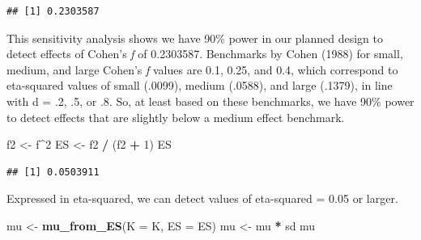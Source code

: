\documentclass[]{book}
\newenvironment{Shaded}{\begin{snugshade}}{\end{snugshade}}
\newcommand{\CommentTok}[1]{\textcolor[rgb]{0.56,0.35,0.01}{\textit{#1}}}
\newcommand{\DataTypeTok}[1]{\textcolor[rgb]{0.13,0.29,0.53}{#1}}
\newcommand{\DecValTok}[1]{\textcolor[rgb]{0.00,0.00,0.81}{#1}}
\newcommand{\FloatTok}[1]{\textcolor[rgb]{0.00,0.00,0.81}{#1}}
\newcommand{\KeywordTok}[1]{\textcolor[rgb]{0.13,0.29,0.53}{\textbf{#1}}}
\newcommand{\NormalTok}[1]{#1}
\newcommand{\OperatorTok}[1]{\textcolor[rgb]{0.81,0.36,0.00}{\textbf{#1}}}
\newcommand{\StringTok}[1]{\textcolor[rgb]{0.31,0.60,0.02}{#1}}
\begin{document}
\begin{Shaded}
\end{Shaded}

\begin{verbatim}
## [1] 0.2303587
\end{verbatim}

This sensitivity analysis shows we have 90\% power in our planned design to detect effects of Cohen's \emph{f} of 0.2303587. Benchmarks by Cohen (1988) for small, medium, and large Cohen's \emph{f} values are 0.1, 0.25, and 0.4, which correspond to eta-squared values of small (.0099), medium (.0588), and large (.1379), in line with d = .2, .5, or .8. So, at least based on these benchmarks, we have 90\% power to detect effects that are slightly below a medium effect benchmark.

\begin{Shaded}
\begin{Highlighting}[]
\NormalTok{f2 <-}\StringTok{ }\NormalTok{f}\OperatorTok{^}\DecValTok{2}
\NormalTok{ES <-}\StringTok{ }\NormalTok{f2 }\OperatorTok{/}\StringTok{ }\NormalTok{(f2 }\OperatorTok{+}\StringTok{ }\DecValTok{1}\NormalTok{)}
\NormalTok{ES}
\end{Highlighting}
\end{Shaded}

\begin{verbatim}
## [1] 0.0503911
\end{verbatim}

Expressed in eta-squared, we can detect values of eta-squared = 0.05 or larger.

\begin{Shaded}
\begin{Highlighting}[]
\NormalTok{mu <-}\StringTok{ }\KeywordTok{mu_from_ES}\NormalTok{(}\DataTypeTok{K =}\NormalTok{ K, }\DataTypeTok{ES =}\NormalTok{ ES)}
\NormalTok{mu <-}\StringTok{ }\NormalTok{mu }\OperatorTok{*}\StringTok{ }\NormalTok{sd}
\NormalTok{mu}
\end{Highlighting}
\end{Shaded}
\end{document}
